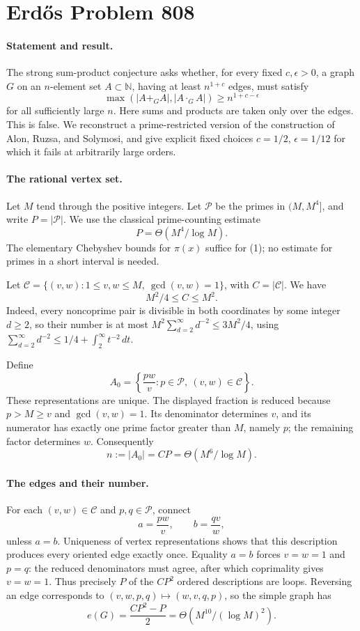 \section*{Erd\H{o}s Problem 808}

\paragraph{Statement and result.}
The strong sum-product conjecture asks whether, for every fixed \(c,\epsilon>0\), a graph \(G\) on an \(n\)-element set \(A\subset\mathbb N\), having at least \(n^{1+c}\) edges, must satisfy
\[
 \max(|A+_GA|,|A\cdot_GA|)\geq n^{1+c-\epsilon}
\]
for all sufficiently large \(n\). Here sums and products are taken only over the edges. This is false. We reconstruct a prime-restricted version of the construction of Alon, Ruzsa, and Solymosi, and give explicit fixed choices \(c=1/2\), \(\epsilon=1/12\) for which it fails at arbitrarily large orders.

\paragraph{The rational vertex set.}
Let \(M\) tend through the positive integers. Let \(\mathcal P\) be the primes in \((M,M^4]\), and write \(P=|\mathcal P|\). We use the classical prime-counting estimate
\[
 P=\Theta(M^4/\log M).
\tag{1}
\]
The elementary Chebyshev bounds for \(\pi(x)\) suffice for (1); no estimate for primes in a short interval is needed.

Let \(\mathcal C=\{(v,w):1\leq v,w\leq M,\ \gcd(v,w)=1\}\), with \(C=|\mathcal C|\). We have
\[
 M^2/4\leq C\leq M^2.
\tag{2}
\]
Indeed, every noncoprime pair is divisible in both coordinates by some integer \(d\geq2\), so their number is at most
\(M^2\sum_{d=2}^{\infty}d^{-2}\leq3M^2/4\), using
\(\sum_{d=2}^{\infty}d^{-2}\leq1/4+\int_2^\infty t^{-2}\,dt\).

Define
\[
 A_0=\left\{\frac{pw}{v}:p\in\mathcal P,\ (v,w)\in\mathcal C\right\}.
\]
These representations are unique. The displayed fraction is reduced because \(p>M\geq v\) and \(\gcd(v,w)=1\). Its denominator determines \(v\), and its numerator has exactly one prime factor greater than \(M\), namely \(p\); the remaining factor determines \(w\). Consequently
\[
 n:=|A_0|=CP=\Theta(M^6/\log M).
\tag{3}
\]

\paragraph{The edges and their number.}
For each \((v,w)\in\mathcal C\) and \(p,q\in\mathcal P\), connect
\[
 a=\frac{pw}{v},\qquad b=\frac{qv}{w},
\]
unless \(a=b\). Uniqueness of vertex representations shows that this description produces every oriented edge exactly once. Equality \(a=b\) forces \(v=w=1\) and \(p=q\): the reduced denominators must agree, after which coprimality gives \(v=w=1\). Thus precisely \(P\) of the \(CP^2\) ordered descriptions are loops. Reversing an edge corresponds to \((v,w,p,q)\mapsto(w,v,q,p)\), so the simple graph has
\[
 e(G)=\frac{CP^2-P}{2}
 =\Theta(M^{10}/(\log M)^2).
\tag{4}
\]

